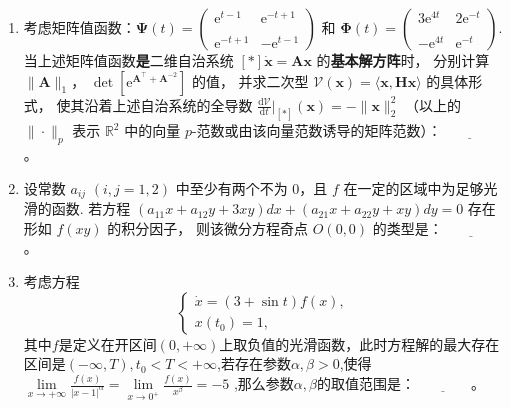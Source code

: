 \begin{enumerate}
\item 考虑矩阵值函数：$\boldsymbol{\Psi}(t)=\begin{pmatrix}
    \mathrm{e}^{t-1}  & \mathrm{e}^{-t+1}  \\ \\
    \mathrm{e}^{-t+1}  & -\mathrm{e}^{t-1} \end{pmatrix}$ 
和 $\boldsymbol{\Phi}(t)=\begin{pmatrix}
   3 \mathrm{e}^{4t} & 2 \mathrm{e}^{-t}  \\ \\
   - \mathrm{e}^{4t}  & \mathrm{e}^{-t} \end{pmatrix}$.
当上述矩阵值函数\textbf{是}二维自治系统 $[*] \dot{\boldsymbol{x}}=\boldsymbol{A x}$ 的\textbf{基本解方阵}时，
分别计算 $\|\boldsymbol{A}\|_1$， $\det\left[\mathrm{e}^{\boldsymbol{A}^{\top}+ \boldsymbol{A}^{-2}}\right]$ 的值，
并求二次型 $\mathcal{V}(\boldsymbol{x})=\langle\boldsymbol{x}, \boldsymbol{H} \boldsymbol{x}\rangle$ 的具体形式，
使其沿着上述自治系统的全导数 $\frac{\mathrm{d} \mathcal{V}}{\mathrm{d} t}\big|_{[*]}(\boldsymbol{x})=-\|\boldsymbol{x}\|_2^{2}$
（以上的 $\|\cdot\|_p$ 表示 $\mathbb{R}^{2}$ 中的向量 $p$-范数或由该向量范数诱导的矩阵范数）：$\underline{\qquad\qquad}$。

\item 设常数 $a_{i j}$ $(i, j=1,2)$ 中至少有两个不为 $0$，且 $f$ 在一定的区域中为足够光滑的函数. 
若方程 $(a_{11} x+a_{12} y+3xy) dx+(a_{21} x+a_{22} y+xy)dy=0$ 存在形如 $f(xy)$ 的积分因子，
则该微分方程奇点 $O(0,0)$ 的类型是：$\underline{\qquad\qquad}$。

\item 考虑方程$$\left\{\begin{array}{l}
\dot{x}=(3+ \sin t) f(x), \\
x(t_0)=1,
\end{array}\right.$$
其中$f$是定义在开区间$(0,+\infty)$上取负值的光滑函数，此时方程解的最大存在区间是$(-\infty,T),t_0 < T < +\infty$,若存在参数$\alpha,\beta > 0$,使得
$\lim\limits_{x \rightarrow+\infty} \frac{f(x)}{|x-1|^{\alpha}}=\lim\limits_{x \rightarrow0^+} \frac{f(x)}{x^{\beta}}=-5$
,那么参数$\alpha,\beta$的取值范围是：$\underline{\qquad\qquad}$。

\end{enumerate}

